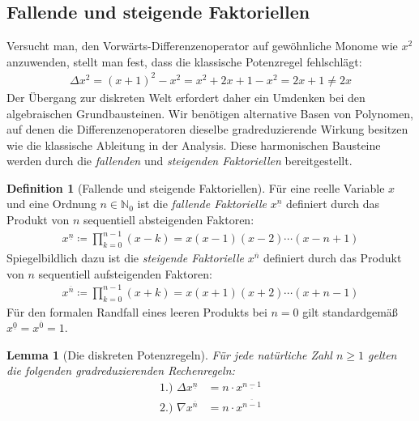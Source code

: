 \documentclass{article}
\newtheorem{lem}[thm]{Lemma}
\theoremstyle{definition}
\newtheorem{defn}[thm]{Definition}
\begin{document}
\subsection{Fallende und steigende Faktoriellen}
Versucht man, den Vorwärts-Differenzenoperator auf gewöhnliche Monome wie $x^2$ anzuwenden, stellt man fest, dass die klassische Potenzregel fehlschlägt:
\begin{align*}
    \Delta x^2 = (x+1)^2 - x^2 = x^2 + 2x + 1 - x^2 = 2x + 1 \neq 2x
\end{align*}
Der Übergang zur diskreten Welt erfordert daher ein Umdenken bei den algebraischen Grundbausteinen. Wir benötigen alternative Basen von Polynomen, auf denen die Differenzenoperatoren dieselbe gradreduzierende Wirkung besitzen wie die klassische Ableitung in der Analysis. Diese harmonischen Bausteine werden durch die \textit{fallenden} und \textit{steigenden Faktoriellen} bereitgestellt.

\begin{defn}[Fallende und steigende Faktoriellen]
Für eine reelle Variable $x$ und eine Ordnung $n \in \mathbb{N}_0$ ist die \textit{fallende Faktorielle} $x^{\underline{n}}$ definiert durch das Produkt von $n$ sequentiell absteigenden Faktoren:
\begin{align*}
    x^{\underline{n}} \coloneqq \prod_{k=0}^{n-1} (x - k) = x(x-1)(x-2)\cdots(x-n+1)
\end{align*}
Spiegelbildlich dazu ist die \textit{steigende Faktorielle} $x^{\overline{n}}$ definiert durch das Produkt von $n$ sequentiell aufsteigenden Faktoren:
\begin{align*}
    x^{\overline{n}} \coloneqq \prod_{k=0}^{n-1} (x + k) = x(x+1)(x+2)\cdots(x+n-1)
\end{align*}
Für den formalen Randfall eines leeren Produkts bei $n = 0$ gilt standardgemäß $x^{\underline{0}} = x^{\overline{0}} = 1$.
\end{defn}

\begin{lem}[Die diskreten Potenzregeln]
Für jede natürliche Zahl $n \ge 1$ gelten die folgenden gradreduzierenden Rechenregeln:
\begin{align*}
    \text{1.) } \Delta x^{\underline{n}} &= n \cdot x^{\underline{n-1}} \\
    \text{2.) } \nabla x^{\overline{n}} &= n \cdot x^{\overline{n-1}}
\end{align*}
\end{lem}
\end{document}

